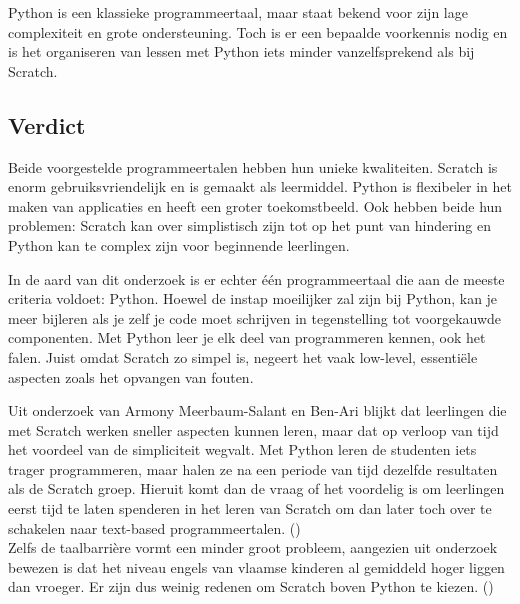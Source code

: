 Python is een klassieke programmeertaal, maar staat bekend voor zijn lage complexiteit en grote ondersteuning. Toch is er een bepaalde voorkennis nodig en is het organiseren van lessen met Python iets minder vanzelfsprekend als bij Scratch.

\subsection{Verdict}

Beide voorgestelde programmeertalen hebben hun unieke kwaliteiten. Scratch is enorm gebruiksvriendelijk en is gemaakt als leermiddel. Python is flexibeler in het maken van applicaties en heeft een groter toekomstbeeld. Ook hebben beide hun problemen: Scratch kan over simplistisch zijn tot op het punt van hindering en Python kan te complex zijn voor beginnende leerlingen. 

In de aard van dit onderzoek is er echter één programmeertaal die aan de meeste criteria voldoet: Python. Hoewel de instap moeilijker zal zijn bij Python, kan je meer bijleren als je zelf je code moet schrijven in tegenstelling tot voorgekauwde componenten. Met Python leer je elk deel van programmeren kennen, ook het falen. Juist omdat Scratch zo simpel is, negeert het vaak low-level, essentiële aspecten zoals het opvangen van fouten. 

Uit onderzoek van Armony Meerbaum-Salant en Ben-Ari blijkt dat leerlingen die met Scratch werken sneller aspecten kunnen leren, maar dat op verloop van tijd het voordeel van de simpliciteit wegvalt. Met Python leren de studenten iets trager programmeren, maar halen ze na een periode van tijd dezelfde resultaten als de Scratch groep. Hieruit komt dan de vraag of het voordelig is om leerlingen eerst tijd te laten spenderen in het leren van Scratch om dan later toch over te schakelen naar text-based programmeertalen. (\cite{Armoni2015,Fagan2017})\\
Zelfs de taalbarrière vormt een minder groot probleem, aangezien uit onderzoek bewezen is dat het niveau engels van vlaamse kinderen al gemiddeld hoger liggen dan vroeger. Er zijn dus weinig redenen om Scratch boven Python te kiezen. (\cite{Denies2015})




